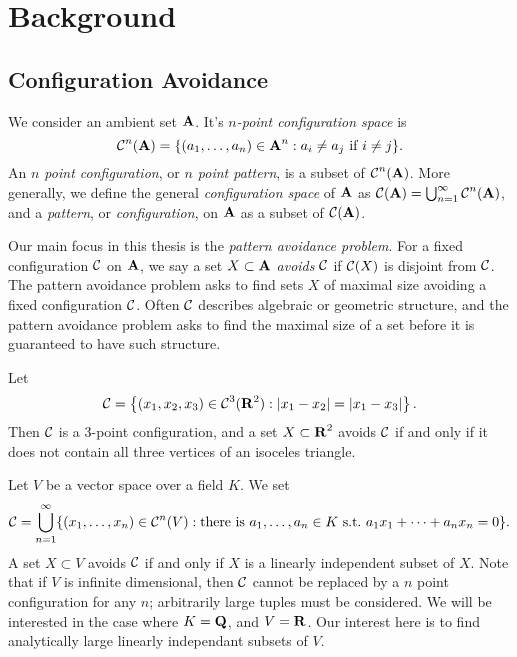 
\chapter{Background}
\label{ch:Background}

\section{Configuration Avoidance}

We consider an ambient set $\operatorname{\mathbf{A}}$. It's \emph{$n$-point configuration space} is
%
\[ \operatorname{\mathcal{C}}^n(\operatorname{\mathbf{A}}) = \{ (a_1, \dots, a_n) \in \operatorname{\mathbf{A}}^n: a_i \neq a_j\ \text{if $i \neq j$} \}. \]
%
An \emph{$n$ point configuration}, or \emph{$n$ point pattern}, is a subset of $\operatorname{\mathcal{C}}^n(\operatorname{\mathbf{A}})$. More generally, we define the general \emph{configuration space} of $\operatorname{\mathbf{A}}$ as $\operatorname{\mathcal{C}}(\operatorname{\mathbf{A}}) = \bigcup_{n = 1}^\infty \operatorname{\mathcal{C}}^n(\operatorname{\mathbf{A}})$, and a \emph{pattern}, or \emph{configuration}, on $\operatorname{\mathbf{A}}$ as a subset of $\operatorname{\mathcal{C}}(\operatorname{\mathbf{A}})$.

Our main focus in this thesis is the \emph{pattern avoidance problem}. For a fixed configuration $\operatorname{\mathcal{C}}$ on $\operatorname{\mathbf{A}}$, we say a set $X \subset \operatorname{\mathbf{A}}$ \emph{avoids} $\operatorname{\mathcal{C}}$ if $\operatorname{\mathcal{C}}(X)$ is disjoint from $\operatorname{\mathcal{C}}$. The pattern avoidance problem asks to find sets $X$ of maximal size avoiding a fixed configuration $\operatorname{\mathcal{C}}$. Often $\operatorname{\mathcal{C}}$ describes algebraic or geometric structure, and the pattern avoidance problem asks to find the maximal size of a set before it is guaranteed to have such structure.

\begin{example}
	Let
	\[ \operatorname{\mathcal{C}} = \left\{ (x_1, x_2, x_3) \in \operatorname{\mathcal{C}}^3(\operatorname{\mathbf{R}}^2) : |x_1-x_2| = |x_1-x_3| \right\}. \]
	Then $\operatorname{\mathcal{C}}$ is a 3-point configuration, and a set $X \subset \operatorname{\mathbf{R}}^2$ avoids $\operatorname{\mathcal{C}}$ if and only if it does not contain all three vertices of an isoceles triangle. %
\end{example}

\begin{example}
	Let $V$ be a vector space over a field $K$. We set
	\[ \C = \bigcup_{n = 1}^\infty \{ (x_1, \dots, x_n) \in \C^n(V): \text{there is}\ a_1, \dots, a_n \in K\ \text{s.t.}\ a_1x_1 + \dots + a_nx_n = 0 \}. \]
	A set $X \subset V$ avoids $\operatorname{\mathcal{C}}$ if and only if $X$ is a linearly independent subset of $X$. Note that if $V$ is infinite dimensional, then $\operatorname{\mathcal{C}}$ cannot be replaced by a $n$ point configuration for any $n$; arbitrarily large tuples must be considered. We will be interested in the case where $K = \operatorname{\mathbf{Q}}$, and $V = \operatorname{\mathbf{R}}$. Our interest here is to find analytically large linearly independant subsets of $V$.
\end{example}

